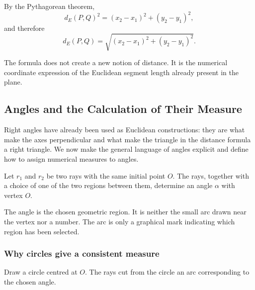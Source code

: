 By the Pythagorean theorem,
\[
d_E(P,Q)^2
=
(x_2-x_1)^2+(y_2-y_1)^2,
\]
and therefore
\[
\boxed{
d_E(P,Q)
=
\sqrt{(x_2-x_1)^2+(y_2-y_1)^2}
}.
\]

The formula does not create a new notion of distance. It is the numerical
coordinate expression of the Euclidean segment length already present in the
plane.

\subsection{Angles and the Calculation of Their Measure}

Right angles have already been used as Euclidean constructions: they are what
make the axes perpendicular and what make the triangle in the distance formula a
right triangle. We now make the general language of angles explicit and define
how to assign numerical measures to angles.

\begin{definitionbox}
Let $r_1$ and $r_2$ be two rays with the same initial point $O$. The rays,
together with a choice of one of the two regions between them, determine an
angle $\alpha$ with vertex $O$.
\end{definitionbox}

The angle is the chosen geometric region. It is neither the small arc drawn
near the vertex nor a number. The arc is only a graphical mark indicating
which region has been selected.

\begin{center}
\end{center}

\subsubsection*{Why circles give a consistent measure}

Draw a circle centred at $O$. The rays cut from the circle an arc corresponding
to the chosen angle.

